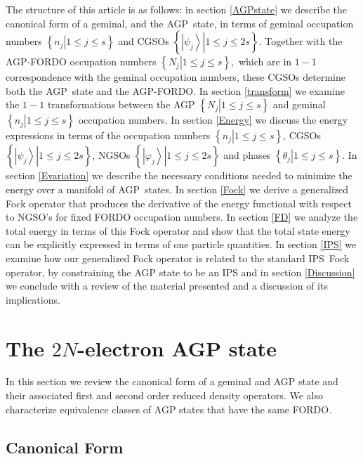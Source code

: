 \documentclass[aps,preprint]{revtex4}%
\begin{document}
The structure of this article is as follows: in section \ref{AGPstate} we
describe the canonical form of a geminal, and the AGP\ state, in terms of
geminal occupation numbers $\left\{  \left.  n_{j}\right\vert 1\leq j\leq
s\right\}  $ and CGSOs $\left\{  \left.  \left\vert \psi_{j}\right\rangle
\right\vert 1\leq j\leq2s\right\}  .$ Together with the AGP-FORDO occupation
numbers $\left\{  \left.  N_{j}\right\vert 1\leq j\leq s\right\}  ,$ which are
in $1-1$ correspondence with the geminal occupation numbers, these CGSOs
determine both the AGP\ state and the AGP-FORDO. In section \ref{transform} we
examine the $1-1$ transformations between the AGP $\left\{  \left.
N_{j}\right\vert 1\leq j\leq s\right\}  $ and geminal $\left\{  \left.
n_{j}\right\vert 1\leq j\leq s\right\}  $ occupation numbers. In section
\ref{Energy} we discuss the energy expressions in terms of the occupation
numbers $\left\{  \left.  n_{j}\right\vert 1\leq j\leq s\right\}  $, CGSOs
$\left\{  \left.  \left\vert \psi_{j}\right\rangle \right\vert 1\leq
j\leq2s\right\}  $, NGSOs $\left\{  \left.  \left\vert \varphi_{j}%
\right\rangle \right\vert 1\leq j\leq2s\right\}  $ and phases $\left\{
\left.  \theta_{j}\right\vert 1\leq j\leq s\right\}  .$ In section
\ref{Evariation} we describe the necessary conditions needed to minimize the
energy over a manifold of AGP\ states. In section \ref{Fock} we derive a
generalized Fock operator that produces the derivative of the energy
functional with respect to NGSO's for fixed FORDO occupation numbers. In
section \ref{FD} we analyze the total energy in terms of this Fock operator
and show that the total state energy can be explicitly expressed in terms of
one particle quantities. In section \ref{IPS} we examine how our generalized
Fock operator is related to the standard IPS\ Fock operator, by constraining
the AGP state to be an IPS and in section \ref{Discussion} we conclude with a
review of the material presented and a discussion of its implications.

\section{The $2N$-electron AGP state\label{AGPstate}}

In this section we review the canonical form of a geminal and AGP state and
their associated first and second order reduced density operators. We also
characterize equivalence classes of AGP states that have the same FORDO.

\subsection{Canonical Form}
\end{document}
